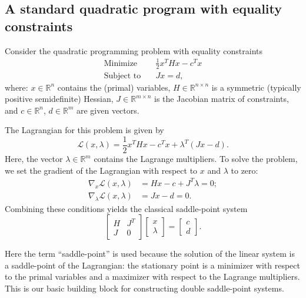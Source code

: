 \documentclass{article}
\begin{document}
\subsection{A standard quadratic program with equality constraints}
Consider the quadratic programming problem with equality constraints \cite{nw06}
\begin{align*}
\text{Minimize} \quad & \frac{1}{2} x^T H x - c^T x \\
\text{Subject to} \quad & J x = d,
\end{align*}
where:
 \( x \in \mathbb{R}^n \) contains the (primal) variables,
   \( H \in \mathbb{R}^{n \times n} \) is a symmetric (typically positive semidefinite) Hessian, 
   \( J \in \mathbb{R}^{m \times n} \) is the Jacobian matrix of constraints, and
  \( c \in \mathbb{R}^n \), \( d \in \mathbb{R}^m \) are given vectors.


The Lagrangian for this problem is given by
\[
\mathcal{L}(x, \lambda) = \frac{1}{2} x^T H x - c^T x + \lambda^T (J x - d).
\]
Here, the vector $\lambda \in \mathbb{R}^m   $ contains the Lagrange multipliers. 
To solve the problem, we set the gradient of the Lagrangian with respect to \( x \) and \( \lambda \) to zero:
\begin{align*}
\nabla_x \mathcal{L}(x, \lambda) &= H x - c + J^T \lambda = 0; \\
\nabla_\lambda \mathcal{L}(x, \lambda) &= J x - d = 0.
\end{align*}
Combining these conditions yields the classical saddle-point system
\begin{equation}
    \label{eq:classical_sp}
\begin{bmatrix}
H & J^T \\
J & 0
\end{bmatrix}
\begin{bmatrix}
x \\
\lambda
\end{bmatrix}
=
\begin{bmatrix}
c \\
d
\end{bmatrix}.
\end{equation}

Here the term ``saddle-point'' is used because the solution of the linear system is a saddle-point of the Lagrangian: the stationary point is a minimizer with respect to the primal variables and a maximizer with respect to the Lagrange multipliers. This is our basic building block for constructing double saddle-point systems.
\end{document}
